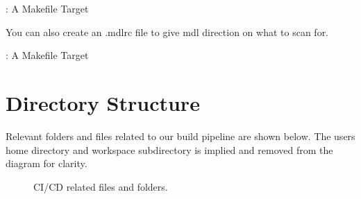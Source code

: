 \justify
\begin{mybox}{\thetcbcounter: A Makefile Target}
	
\end{mybox}

\justify
You can also create an .mdlrc file to give mdl direction on what to scan for.

\justify
\begin{mybox}{\thetcbcounter: A Makefile Target}
	
\end{mybox}

\clearpage

\section{Directory Structure}

\justify
Relevant folders and files related to our build pipeline are shown below. The users home directory
and workspace subdirectory is implied and removed from the diagram for clarity.

\begin{figure}[!htb]
	
	\caption{CI/CD related files and folders.}
\end{figure}
